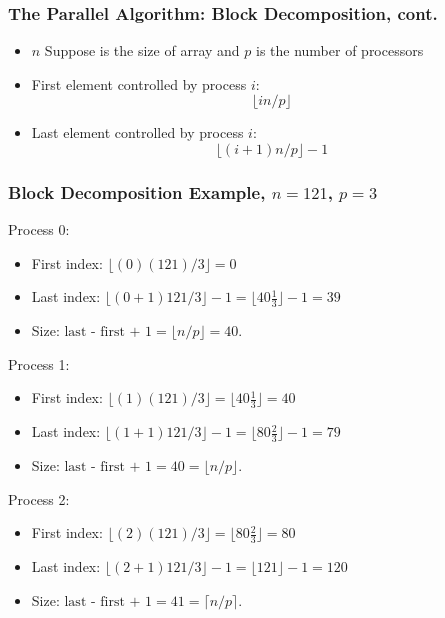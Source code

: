 \documentclass[13pt]{beamer}
\begin{document}
\begin{frame}
\frametitle{The Parallel Algorithm: Block Decomposition, cont.}
  \begin{itemize}
    \item $n$ Suppose is the size of array and $p$ is the number of processors
    \item First element controlled by process $i$: $$\lfloor i n / p \rfloor$$
    \item Last element controlled by process $i$: $$\lfloor (i + 1) n / p \rfloor - 1$$
  \end{itemize}
\end{frame}

\begin{frame}
\frametitle{Block Decomposition Example, $n = 121$, $p = 3$}
    \alert{Process 0:}
    \begin{itemize}
    \item First index: $\lfloor (0) (121) / 3 \rfloor = 0$
    \item Last index: $\lfloor (0 + 1) 121 / 3 \rfloor - 1 = \lfloor 40\frac{1}{3} \rfloor - 1 = 39$
    \item Size: $\text{last - first + 1} = \lfloor n / p \rfloor = 40$.
    \end{itemize}

    \alert{Process 1:}
    \begin{itemize}
    \item First index: $\lfloor (1) (121) / 3 \rfloor = \lfloor 40\frac{1}{3} \rfloor = 40$
    \item Last index: $\lfloor (1 + 1) 121 / 3 \rfloor - 1 = \lfloor 80\frac{2}{3} \rfloor - 1 = 79$
    \item Size: $\text{last - first + 1} = 40 = \lfloor n / p \rfloor$.
    \end{itemize}

    \alert{Process 2:}
    \begin{itemize}
    \item First index: $\lfloor (2) (121) / 3 \rfloor = \lfloor 80\frac{2}{3} \rfloor = 80$
    \item Last index: $\lfloor (2 + 1) 121 / 3 \rfloor - 1 = \lfloor 121 \rfloor - 1 = 120$
    \item Size: $\text{last - first + 1} = 41 = \lceil n / p \rceil$.
    \end{itemize}

\end{frame}
\end{document}
